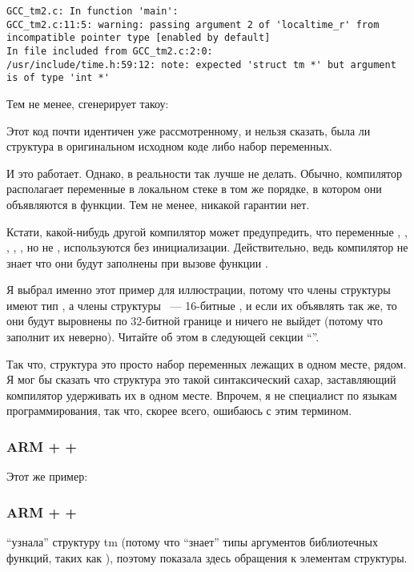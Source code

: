 \begin{lstlisting}[caption=GCC 4.7.3]
GCC_tm2.c: In function 'main':
GCC_tm2.c:11:5: warning: passing argument 2 of 'localtime_r' from incompatible pointer type [enabled by default]
In file included from GCC_tm2.c:2:0:
/usr/include/time.h:59:12: note: expected 'struct tm *' but argument is of type 'int *'
\end{lstlisting}

Тем не менее, сгенерирует такоу:



Этот код почти идентичен уже рассмотренному, и нельзя сказать, была ли структура
в оригинальном исходном коде либо набор переменных.

И это работает. Однако, в реальности так лучше не делать. Обычно, компилятор располагает переменные в локальном
стеке в том же порядке, в котором они объявляются в функции. Тем не менее, никакой гарантии нет.

Кстати, какой-нибудь другой компилятор может предупредить, что переменные , , ,
, , но не , используются без инициализации. 
Действительно, ведь компилятор не знает
что они будут заполнены при вызове функции .

Я выбрал именно этот пример для иллюстрации, потому что члены структуры имеют тип \Tint, а члены структуры
 ~--- 16-битные , и если их объявлять так же, то они будут выровнены по 32-битной границе 
и ничего не выйдет (потому что  заполнит их неверно). Читайте об этом в следующей секции
``\StructurePackingSectionName''.

\index{\SyntacticSugar}
Так что, структура это просто набор переменных лежащих в одном месте, рядом. Я мог бы сказать что структура
это такой синтаксический сахар, заставляющий компилятор удерживать их в одном месте. Впрочем, я не специалист
по языкам программирования, так что, скорее всего, ошибаюсь с этим термином.

\subsubsection{ARM + \OptimizingKeil + \ThumbMode}

Этот же пример:



\subsubsection{ARM + \OptimizingXcode + \ThumbTwoMode}

\IDA ``узнала'' структуру tm (потому что \IDA ``знает'' типы аргументов библиотечных функций, 
таких как ), поэтому показала здесь обращения к элементам структуры.



